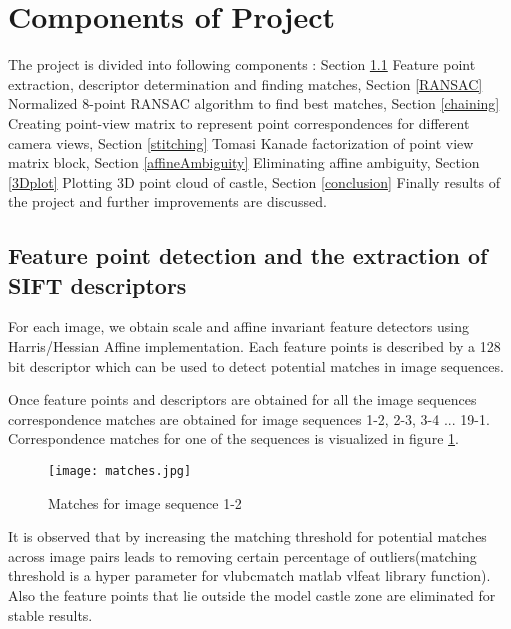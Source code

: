 \documentclass[11pt,twocolumn,pdftex]{article}
\begin{document}
\section{Components of Project}
The project is divided into following components : Section \ref{featureSelection} Feature point extraction, descriptor determination and finding matches,
Section \ref{RANSAC}  Normalized 8-point RANSAC algorithm to find best matches,
Section \ref{chaining} Creating point-view matrix to represent point correspondences for different camera views,
Section \ref{stitching} Tomasi Kanade factorization of point view matrix block,
Section \ref{affineAmbiguity} Eliminating affine ambiguity,
Section \ref{3Dplot} Plotting 3D point cloud of castle,
Section \ref{conclusion} Finally results of the project and further improvements are discussed. 

\subsection{Feature point detection and the extraction of SIFT descriptors} \label{featureSelection}
For each image, we obtain scale and affine invariant feature detectors using Harris/Hessian Affine implementation. Each feature points is described by a 128 bit descriptor which can be used to detect potential matches in image sequences.

Once feature points and descriptors are obtained for all the image sequences correspondence matches are obtained for image sequences 1-2, 2-3, 3-4 ... 19-1. Correspondence matches for one of the sequences is visualized in figure \ref{fig:matches}. 

\begin{figure}[h]
	\centering 
    \texttt{[image: matches.jpg]}
    \caption{Matches for image sequence 1-2}
    \label{fig:matches}
\end{figure}

It is observed that by increasing the matching threshold for potential matches across image pairs leads to removing certain percentage of outliers(matching threshold is a hyper parameter for vlubcmatch matlab vlfeat library function). Also the feature points that lie outside the model castle zone are eliminated for stable results.
\end{document}
